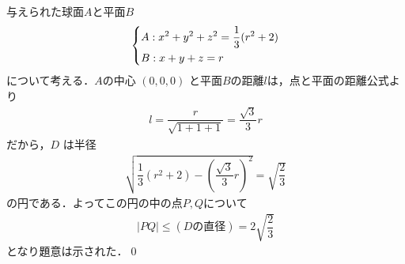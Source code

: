 \documentclass[../../main.tex]{subfiles}
\begin{document}
与えられた球面$A$と平面$B$
\begin{align}
  \begin{dcases}
    A: x^2+y^2+z^2=\dfrac{1}{3}(r^2+2) \\
    B: x+y+z=r
  \end{dcases} \label{eq:1}
\end{align}
について考える．$A$の中心 $(0,0,0)$ と平面$B$の距離$l$は，点と平面の距離公式より
\begin{align}
  l = \dfrac{r}{\sqrt{1+1+1}} = \dfrac{\sqrt{3}}{3}r
\end{align}
だから，$D$ は半径
\begin{align}
  \sqrt{\dfrac{1}{3}(r^2+2) - \left(\dfrac{\sqrt{3}}{3}r\right)^2} = \sqrt{\dfrac{2}{3}}
\end{align}
の円である．よってこの円の中の点$P,Q$について
\begin{align}
  |PQ| \le (D\text{の直径}) = 2\sqrt{\dfrac{2}{3}}
\end{align}
となり題意は示された．\qed
\end{document}
